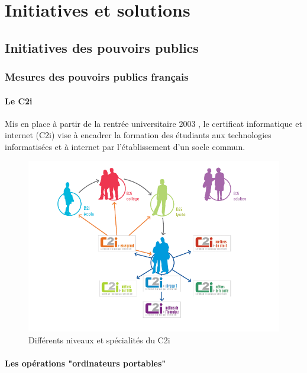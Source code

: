 
\chapter{Initiatives et solutions}\label{initiatives_actuelles}

\section{Initiatives des pouvoirs publics}

\subsection{Mesures des pouvoirs publics français}
\subsubsection{Le C2i}

Mis en place à partir de la rentrée universitaire 2003
\cite{circulaire_c2i}, le certificat informatique et internet (C2i)
vise à encadrer la formation des étudiants aux technologies
informatisées et à internet par l'établissement d'un socle commun.

\begin{figure}[H]
  \centering
  \includegraphics[width=\textwidth]{../resources/illustrations/c2i}
  \caption{Différents niveaux et spécialités du C2i}
\end{figure}

\cite{b2i_c2i}
\cite{b2i}
\cite{isn}

\subsubsection{Les opérations "ordinateurs portables"}

